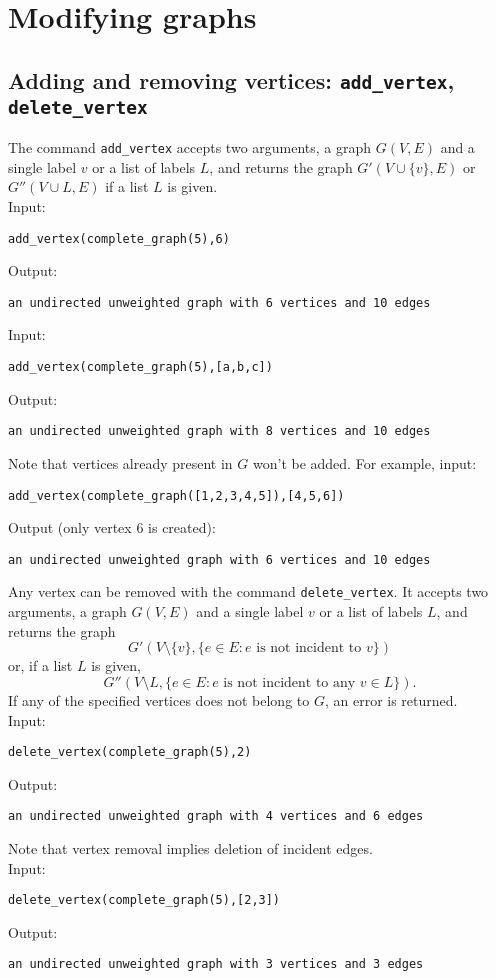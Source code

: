 \documentclass[a4paper,11pt]{article}
\begin{document}
\section{Modifying graphs}

\subsection{Adding and removing vertices: {\tt add\_vertex}, {\tt delete\_vertex}}
The command {\tt add\_vertex} accepts two arguments, a graph $ G(V,E) $ and a single label $ v $ or a list of labels $ L $, and returns the graph $ G'(V\cup\{v\},E) $ or $ G''(V\cup L,E) $ if a list $ L $ is given.\\
Input:
\begin{center}
  \tt add\_vertex(complete\_graph(5),6)
\end{center}
Output:
\begin{center}
  \tt an undirected unweighted graph with 6 vertices and 10 edges
\end{center}
Input:
\begin{center}
  \tt add\_vertex(complete\_graph(5),[a,b,c])
\end{center}
Output:
\begin{center}
  \tt an undirected unweighted graph with 8 vertices and 10 edges
\end{center}
Note that vertices already present in $ G $ won't be added. For example, input:
\begin{center}
  \tt add\_vertex(complete\_graph([1,2,3,4,5]),[4,5,6])
\end{center}  
Output (only vertex 6 is created):
\begin{center}
  \tt an undirected unweighted graph with 6 vertices and 10 edges
\end{center}

Any vertex can be removed with the command {\tt delete\_vertex}. It accepts two arguments, a graph $ G(V,E) $ and a single label $ v $ or a list of labels $ L $, and returns the graph \[ G'(V\setminus\{v\},\{e\in E:e \text{ is not incident to } v\}) \] or, if a list $ L $ is given, \[ G''(V\setminus L,\{e\in E:e \text{ is not incident to any } v\in L\}). \]
If any of the specified vertices does not belong to $ G $, an error is returned.\\
Input:
\begin{center}
  \tt delete\_vertex(complete\_graph(5),2)
\end{center}
Output:
\begin{center}
  \tt an undirected unweighted graph with 4 vertices and 6 edges
\end{center}
Note that vertex removal implies deletion of incident edges.\\
Input:
\begin{center}
  \tt delete\_vertex(complete\_graph(5),[2,3])
\end{center}
Output:
\begin{center}
  \tt an undirected unweighted graph with 3 vertices and 3 edges
\end{center}
\end{document}
